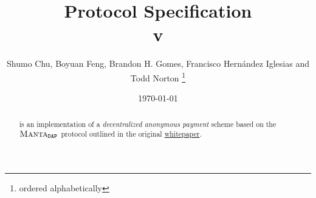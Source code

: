\documentclass{article}
\title{\textbf{\MantaPay{} Protocol Specification}\\ v}
\author{Shumo Chu, Boyuan Feng, Brandon H. Gomes, Francisco Hernández Iglesias and Todd Norton \thanks{ordered alphabetically}}
\date{\today}
\begin{document}
    
\maketitle

\begin{abstract}
    \MantaPay{} is an implementation of a \emph{decentralized anonymous payment} scheme based on the ${{\textsc{Manta}}{}_{\texttt{DAP}}}$ protocol outlined in the original \href{https://eprint.iacr.org/2021/743.pdf}{\Manta{} whitepaper}.
\end{abstract}
    
\tableofcontents
\newpage











\end{document}
